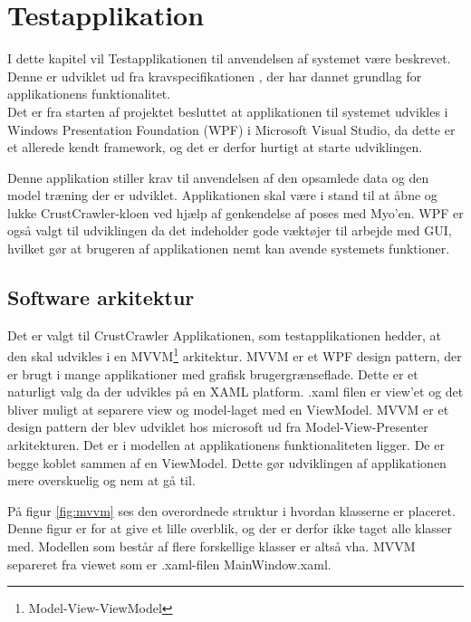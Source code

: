 \thispagestyle{fancy}
\chapter{Testapplikation}
I dette kapitel vil Testapplikationen til anvendelsen af systemet være beskrevet. Denne er udviklet ud fra kravspecifikationen \citep{RefWorks:8}, der har dannet grundlag for applikationens funktionalitet.\\
Det er fra starten af projektet besluttet at applikationen til systemet udvikles i Windows Presentation Foundation (WPF) i Microsoft Visual Studio, da dette er et allerede kendt framework, og det er derfor hurtigt at starte udviklingen.

Denne applikation stiller krav til anvendelsen af den opsamlede data og den model træning der er udviklet. Applikationen skal være i stand til at åbne og lukke CrustCrawler-kloen ved hjælp af genkendelse af poses med Myo'en. WPF er også valgt til udviklingen da det indeholder gode væktøjer til arbejde med GUI, hvilket gør at brugeren af applikationen nemt kan avende systemets funktioner.

\section{Software arkitektur}
Det er valgt til CrustCrawler Applikationen, som testapplikationen hedder, at den skal udvikles i en MVVM\footnote{Model-View-ViewModel} \citep{RefWorks:14} arkitektur. MVVM er et WPF design pattern, der er brugt i mange applikationer med grafisk brugergrænseflade. Dette er et naturligt valg da der udvikles på en XAML platform. .xaml filen er view'et og det bliver muligt at separere view og model-laget med en ViewModel. MVVM er et design pattern der blev udviklet hos microsoft ud fra Model-View-Presenter arkitekturen. Det er i modellen at applikationens funktionaliteten ligger. De er begge koblet sammen af en ViewModel. Dette gør udviklingen af applikationen mere overskuelig og nem at gå til.


På figur \ref{fig:mvvm} ses den overordnede struktur i hvordan klasserne er placeret. Denne figur er for at give et lille overblik, og der er derfor ikke taget alle klasser med. Modellen som består af flere forskellige klasser er altså vha. MVVM separeret fra viewet som er .xaml-filen MainWindow.xaml.


